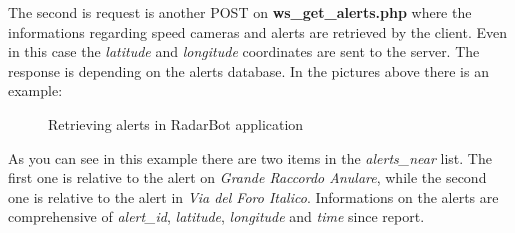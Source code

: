 			The second is request is another POST on \textbf{ws\_get\_alerts.php} where the informations regarding speed cameras and alerts are retrieved by the client. Even in this case the \textit{latitude} and \textit{longitude} coordinates are sent to the server. The response is depending on the alerts database. In the pictures above there is an example:
			\begin{figure}[H]
				\centering
				\caption{Retrieving alerts in RadarBot application}
				\label{radarbot_alert}
			\end{figure}
			\par As you can see in this example there are two items in the \textit{alerts\_near} list. The first one is relative to the alert on \textit{Grande Raccordo Anulare}, while the second one is relative to the alert in \textit{Via del Foro Italico}. Informations on the alerts are comprehensive of \textit{alert\_id}, \textit{latitude}, \textit{longitude} and \textit{time} since report.\newline
			
